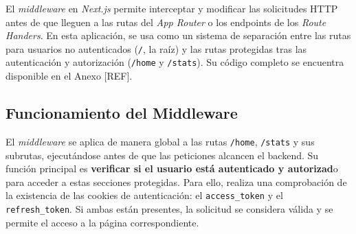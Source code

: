 



El \textit{middleware} en \textit{Next.js} permite interceptar y modificar las solicitudes HTTP antes de que lleguen a las rutas del \textit{App Router} o los endpoints de los \textit{Route Handers}. En esta aplicación, se usa como un sistema de separación entre las rutas para usuarios no autenticados (\texttt{/}, la raíz) y las rutas protegidas tras las autenticación y autorización (\texttt{/home} y \texttt{/stats}). Su código completo se encuentra disponible en el Anexo [REF].

\subsection{Funcionamiento del Middleware}

El \textit{middleware} se aplica de manera global a las rutas \texttt{/home}, \texttt{/stats} y sus subrutas, ejecutándose antes de que las peticiones alcancen el backend. Su función principal es \textbf{verificar si el usuario está autenticado y autorizad}o para acceder a estas secciones protegidas. Para ello, realiza una comprobación de la existencia de las cookies de autenticación: el \texttt{access\_token} y el \texttt{refresh\_token}. Si ambas están presentes, la solicitud se considera válida y se permite el acceso a la página correspondiente.

